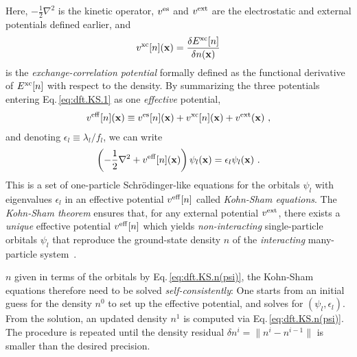 Here, $-\frac{1}{2} \nabla^2$ is the kinetic operator, $v^{\rm es}$ and $v^{\rm ext}$ are the electrostatic and external potentials defined earlier, and
\begin{align}
	v^{\rm xc} [n] ({\bf x})
		= \frac{\delta E^{\rm xc}[n]}{\delta n ({\bf x})}
	\label{eq:dft.vxc}
\end{align}
is the \emph{exchange-correlation potential} formally defined as the functional derivative of $E^{\rm xc} [n]$ with respect to the density. By summarizing the three potentials entering Eq.\,\eqref{eq:dft.KS.1} as one \emph{effective} potential,
\begin{align}
	v^{\rm eff} [n] ({\bf x})
	\equiv
		v^{\rm es} [n] ({\bf x})
		+ v^{\rm xc} [n] ({\bf x})
		+ v^{\rm ext}  ({\bf x})~,
	\label{eq:dft.KS.veff}
\end{align}
 and denoting $\epsilon_l \equiv \lambda_l / f_l$, we can write
\begin{align}
	\left(
		-\frac{1}{2} \nabla^2 
		+ v^{\rm eff} [n] ({\bf x})
	\right) \psi_l ({\bf x})
	= \epsilon_l \psi_l ({\bf x})~.
\label{eq:dft.KS.2}
\end{align}
This is a set of one-particle Schr\"odinger-like equations for the orbitals $\psi_l$ with eigenvalues $\epsilon_l$ in an effective potential $v^{\rm eff}[n]$ called \emph{Kohn-Sham equations}. The \emph{Kohn-Sham theorem} ensures that, for any external potential $v^{\rm ext}$, there exists a \emph{unique} effective potential $v^{\rm eff}[n]$ which yields \emph{non-interacting} single-particle orbitals $\psi_l$ that reproduce the ground-state density $n$ of the \emph{interacting} many-particle system~\cite[p.\,51]{Kohn1965}.

 $n$ given in terms of the orbitals by Eq.\,\eqref{eq:dft.KS.n(psi)}, the Kohn-Sham equations therefore need to be solved \emph{self-consistently}: One starts from an initial guess for the density $n^0$ to set up the effective potential, and solves for $(\psi_l, \epsilon_l)$. From the solution, an updated density $n^1$ is computed via Eq.\,\eqref{eq:dft.KS.n(psi)}. The procedure is repeated until the density residual $\delta n^i = \lVert n^i - n^{i-1} \rVert$ is smaller than the desired precision. 


